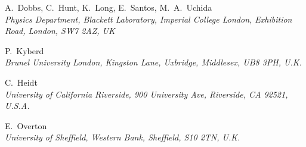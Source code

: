 \clearpage
\thispagestyle{plain}
\setlength\parindent{0em}%
  A.~Dobbs, C.~Hunt, K.~Long, E.~Santos, M.~A.~Uchida
  \\{\it
    Physics Department, Blackett Laboratory, Imperial College London,
    Exhibition Road, London, SW7 2AZ, UK
  }
  \par \filbreak
  P.~Kyberd
  \\{\it
    Brunel University London, Kingston Lane, Uxbridge,
    Middlesex, UB8 3PH, U.K.
  } \\ 
  \par \filbreak
  C.~Heidt
  \\{\it
    University of California Riverside,
    900 University Ave, Riverside, CA 92521, U.S.A.
  } \\ 
  \par 
  E.~Overton
  \\{\it
    University of Sheffield, Western Bank, Sheffield, S10 2TN, U.K. 
  }\\
  \par \filbreak
